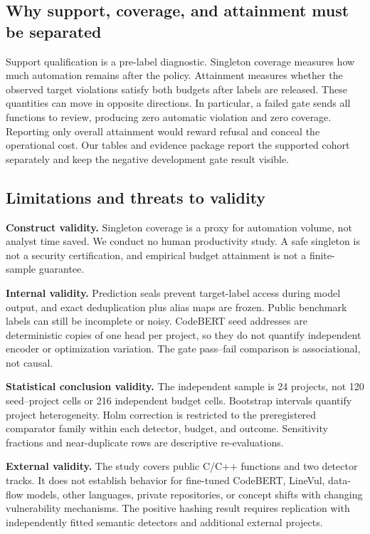 \documentclass[research]{fcs}
\begin{document}
\subsection{Why support, coverage, and attainment must be separated}

Support qualification is a pre-label diagnostic. Singleton coverage measures how much automation remains after the policy. Attainment measures whether the observed target violations satisfy both budgets after labels are released. These quantities can move in opposite directions. In particular, a failed gate sends all functions to review, producing zero automatic violation and zero coverage. Reporting only overall attainment would reward refusal and conceal the operational cost. Our tables and evidence package report the supported cohort separately and keep the negative development gate result visible.

\subsection{Limitations and threats to validity}

\textbf{Construct validity.} Singleton coverage is a proxy for automation volume, not analyst time saved. We conduct no human productivity study. A safe singleton is not a security certification, and empirical budget attainment is not a finite-sample guarantee.

\textbf{Internal validity.} Prediction seals prevent target-label access during model output, and exact deduplication plus alias maps are frozen. Public benchmark labels can still be incomplete or noisy. CodeBERT seed addresses are deterministic copies of one head per project, so they do not quantify independent encoder or optimization variation. The gate pass--fail comparison is associational, not causal.

\textbf{Statistical conclusion validity.} The independent sample is 24 projects, not 120 seed--project cells or 216 independent budget cells. Bootstrap intervals quantify project heterogeneity. Holm correction is restricted to the preregistered comparator family within each detector, budget, and outcome. Sensitivity fractions and near-duplicate rows are descriptive re-evaluations.

\textbf{External validity.} The study covers public C/C++ functions and two detector tracks. It does not establish behavior for fine-tuned CodeBERT, LineVul, data-flow models, other languages, private repositories, or concept shifts with changing vulnerability mechanisms. The positive hashing result requires replication with independently fitted semantic detectors and additional external projects.
\end{document}

